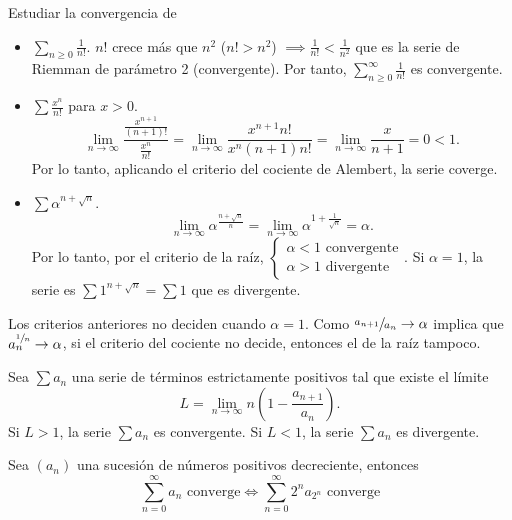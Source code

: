 \begin{example}
    Estudiar la convergencia de
    \begin{itemize}
        \item $\sum\limits_{n \geq 0} \frac{1}{n!}$.
            $n!$ crece más que    $n^2$ ($n! > n^2$) $\implies \frac{1}{n!} < \frac{1}{n^2}$
            que es la serie de Riemman de parámetro 2 (convergente). Por tanto,
            $\sum\limits_{n \geq 0}^\infty \frac{1}{n!}$ es convergente.
        \item $\sum \frac{x^n}{n!}$ para $x > 0$.
            \[
                \lim_{n \to \infty} \frac{\frac{x^{n+1}}{(n+1)!}}{\frac{x^n}{n!}} =
                \lim_{n \to \infty} \frac{x^{n+1}n!}{x^n(n+1)n!} = \lim_{n \to \infty}
                \frac{x}{n+1} = 0 < 1.
            \]
            Por lo tanto, aplicando el criterio del cociente de Alembert, la serie coverge.
        \item $\sum \alpha^{n+\sqrt{n}}$.
            \[
                \lim_{n \to \infty} \alpha^{\frac{n + \sqrt{n}}{n}} =
                \lim_{n \to \infty} \alpha^{1 + \frac{1}{\sqrt{n}}} = \alpha.
            \]
            Por lo tanto, por el criterio de la raíz, $\begin{cases} \alpha < 1
            \text{ convergente} \\ \alpha > 1 \text{ divergente}\end{cases}$. Si $\alpha =1$,
            la serie es $\sum 1^{n + \sqrt{n}} = \sum 1$ que es divergente.
    \end{itemize}
\end{example}

\begin{obs}
    Los criterios anteriores no deciden cuando $\alpha = 1$. Como $\sfrac{a_{n+1}}{a_n} \to
    \alpha$ implica que $a_n^{\sfrac{1}{n}} \to \alpha$, si el criterio del cociente no
    decide, entonces el de la raíz tampoco.
\end{obs}

\begin{prop}
    Sea $\sum a_n$ una serie de términos estrictamente positivos tal que existe el límite
    \[
        L = \lim_{n \to \infty} n\left( 1 - \frac{a_{n+1}}{a_n} \right).
    \]
    Si $L > 1$, la serie $\sum a_n$ es convergente. Si $L < 1$, la serie $\sum a_n$ es
    divergente.
\end{prop}

\begin{prop}
    Sea $(a_n)$ una sucesión de números positivos decreciente, entonces
    \[
        \sum_{n=0}^{\infty} a_n \text{ converge} \iff \sum_{n=0}^{\infty} 2^n a_{2^n}
        \text{ converge}
    \]
\end{prop}

